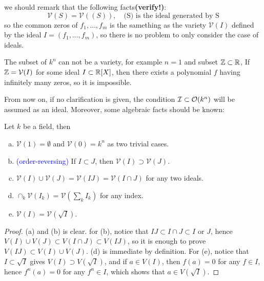 \begin{remark} \label{varietymakestop}
    we should remark that the following facts\textbf{(verify!)}: \\
\[\mathcal{V}(S) = \mathcal{V}((S)), \quad \text{(S) is the ideal generated by S}\]
so the common zeros of \(f_1,\dots,f_m\) is the samething as the variety \(\mathcal{V}(I)\) defined by the ideal \(I = (f_1,\dots,f_m)\), so there is no problem to only consider the case of ideals. \\
\end{remark}

\begin{remark}
    The subset of \(k^n\) can not be a variety, for example \(n = 1\) and subset \(\mathbb{Z} \subset \mathbb{R}\), If \(\mathbb{Z} = \mathcal{V}(I)\) for some ideal \(I \subset \mathbb{R}[X]\), then there exists a polynomial \(f\) having infinitely many zeros, so it is impossible.
\end{remark}

From now on, if no clarification is given, the condition \(\mathcal{I} \subset \mathcal{O}(k^n)\) will be assumed as an ideal. Moreover, some algebraic facts should be known:

\begin{proposition} \label{algberaic-subset}
    Let \(k\) be a field, then 
    \begin{enumerate}[(a)]
        \item  \(\mathcal{V}(1) = \emptyset\) and \(\mathcal{V}(0) = k^n\) as two trivial cases.
        \item \textcolor{blue}{(order-reversing)} If \(I \subset J\), then \(\mathcal{V}(I) \supset \mathcal{V}(J)\).
        \item \(\mathcal{V}(I)\cup \mathcal{V}(J) = \mathcal{V}(IJ) = \mathcal{V}(I \cap J)\) for any two ideals.
        \item \(\cap_{k}\mathcal{V}(I_k) = \mathcal{V}(\sum_k I_k)\) for any index.
        \item \(\mathcal{V}(I) = \mathcal{V}(\sqrt{I})\).
    \end{enumerate}
\end{proposition}

\begin{proof}
    (a) and (b) is clear. for (b), notice that \(IJ \subset I \cap J \subset I\) or \(J\), hence \(V(I) \cup V(J) \subset V(I \cap J) \subset V(IJ)\), so it is enough to prove \(V(IJ) \subset V(I) \cup V(J)\). (d) is immediate by definition. For (e), notice that \(I \subset \sqrt{I}\) gives \(V(I) \supset V(\sqrt{I})\), and if \(a \in V(I)\), then \(f(a) = 0\) for any \(f \in I\), hence \(f^n(a) = 0\) for any \(f^n \in I\), which shows that \(a \in V(\sqrt{I})\).
\end{proof}

